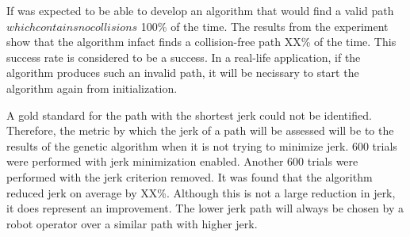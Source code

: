 If was expected to be able to develop an algorithm that would find a valid path \(which contains no collisions\) 100\% of the time. The results from the experiment show that the algorithm infact finds a collision-free path XX\% of the time. This success rate is considered to be a success. In a real-life application, if the algorithm produces such an invalid path, it will be necissary to start the algorithm again from initialization. 

A gold standard for the path with the shortest jerk could not be identified. Therefore, the metric by which the jerk of a path will be assessed will be to the results of the genetic algorithm when it is not trying to minimize jerk. 600 trials were performed with jerk minimization enabled. Another 600 trials were performed with the jerk criterion removed. It was found that the algorithm reduced jerk on average by XX\%. Although this is not a large reduction in jerk, it does represent an improvement. The lower jerk path will always be chosen by a robot operator over a similar path with higher jerk.



